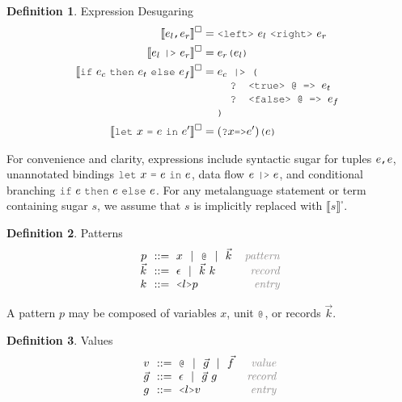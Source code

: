 \documentclass[acmsmall]{acmart}
\theoremstyle{definition}
\newtheorem{definition}{Definition}[section]
\begin{document}
\hfill
\begin{definition} 
  \label{def:expression_desugaring}
  Expression Desugaring
  \hfill 
  \\
  \begin{align*}
      \llbracket e_l \J{,} e_r \rrbracket^\square &= \J{<left>}\ e_l \ \J{<right>}\ e_r
      \\
      \llbracket e_l\ \J{|>}\ e_r \rrbracket^\square &= e_r\J{(}e_l\J{)}
      \\
      \llbracket \J{if}\ e_c\ \J{then}\ e_t\ \J{else}\ e_f \rrbracket^\square &= 
      \begin{array}[t]{@{} l}
        e_c \J{ |> (}
          \\
          \I \J{? <true> @ => } e_t
          \\
          \I \J{? <false> @ => } e_f
          \\
        \J{)}
      \end{array}
      \\
      \llbracket \J{let}\ x\ \J{=}\ e\ \J{in}\ e' \rrbracket^\square &= (\J{?}x \J{=>} e')\J{(}e\J{)}
  \end{align*}

\end{definition} 
\hfill

For convenience and clarity, expressions include syntactic sugar for tuples $e\J{,}e$, 
unannotated bindings $\J{let}\ x\ \J{=}\ e\ \J{in}\ e$, data flow $e\ \J{|>}\ e$,
and conditional branching $\J{if}\ e\ \J{then}\ e\ \J{else}\ e$.
For any metalanguage statement or term containing sugar $s$, we assume that $s$ is implicitly replaced with $\llbracket s \rrbracket^\square$.

\hfill
\begin{definition} Patterns 
  \label{def:patterns}
  \[\begin{array}[t]{r@{}l@{}r}
    \nonterm{p} & \is 
      x \sep
      \J{@} \sep
      \vec{k}
    & \com{pattern}
    \\
    \nonterm{\vec{k}} & \is \epsilon \sep \vec{k}\ k
    & \com{record}
    \\
    \nonterm{k} & \is \J{<}l\J{>}p
    & \com{entry}
  \end{array}\]
\end{definition}
\hfill

A pattern $p$ may be composed of variables $x$, unit $\J{@}$, or records $\vec{k}$. 

\hfill
\begin{definition} Values 
  \label{def:values}
  \[\begin{array}[t]{r@{}l@{}r}
    \nonterm{v} & \is 
      \J{@} \sep
      \vec{g} \sep
      \vec{f}
    & \com{value}
    \\
    \nonterm{\vec{g}} & \is \epsilon \sep \vec{g}\ g
    & \com{record}
    \\
    \nonterm{g} & \is \J{<}l\J{>}v
    & \com{entry}
  \end{array}\]
\end{definition}
\hfill
\end{document}
